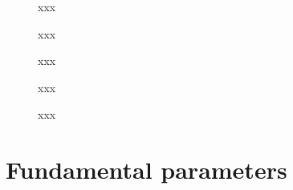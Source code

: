 \documentclass[referee]{aa}
\begin{document}
\begin{appendix}
 \begin{figure}
  \caption{xxx}
  \label{fig:4struct}
 \end{figure}

 \begin{figure}
  \caption{xxx}
  \label{fig:8struct}
 \end{figure}

 \begin{figure}
  \caption{xxx}
  \label{fig:12struct}
 \end{figure}

 \begin{figure}
  \caption{xxx}
  \label{fig:16struct}
 \end{figure}

 \begin{figure}
  \caption{xxx}
  \label{fig:20struct}
 \end{figure}



\section{Fundamental parameters}
 \label{app:fundam_params}


\end{appendix}
\end{document}
